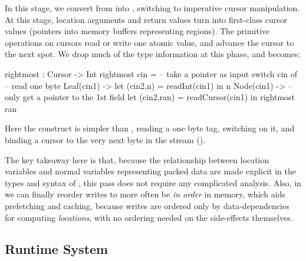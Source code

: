 In this stage, we convert from \ourcalc{} into \lamcur{}, switching to
imperative cursor manipulation.
%
At this stage, location arguments and return values turn into first-class cursor
values (pointers into memory buffers representing regions).  The primitive
operations on cursors read or write one atomic value, and advance the cursor to
the next spot.  We drop much of the type information at this phase, and
 becomes:
\begin{code}
rightmost : Cursor -> Int
rightmost cin =   -- take a pointer as input
  switch cin of   -- read one byte
    Leaf(cin1)  ->
      let (cin2,n) = readInt(cin1) in n
    Node(cin1)  -> -- only get a pointer to the 1st field
      let (cin2,ran) = readCursor(cin1) in
      rightmost ran
\end{code}\vspace{-1mm}
%
Here the  construct is simpler than ,
reading a one byte tag, switching on
it, and binding a cursor to the very next byte in the stream
().

%
The key takeaway here is that, because the relationship between
location variables and normal variables representing packed data are
made explicit in the types and syntax of \ourcalc{}, this pass
does not require any complicated analysis.
%
Also, in \lamcur{} we can finally reorder writes to more often be {\em in order}
in memory, which aids prefetching and caching,
because writes are ordered only by
data-dependencies for computing \emph{locations}, with no ordering needed
on the side-effects themselves.

\subsection{Runtime System}\label{subsec:rts}

